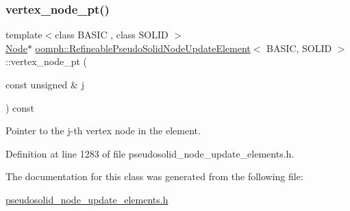 \subsubsection{\texorpdfstring{vertex\+\_\+node\+\_\+pt()}{vertex\_node\_pt()}}
{\footnotesize\ttfamily template$<$class B\+A\+S\+IC , class S\+O\+L\+ID $>$ \\
\hyperlink{classoomph_1_1Node}{Node}$\ast$ \hyperlink{classoomph_1_1RefineablePseudoSolidNodeUpdateElement}{oomph\+::\+Refineable\+Pseudo\+Solid\+Node\+Update\+Element}$<$ B\+A\+S\+IC, S\+O\+L\+ID $>$\+::vertex\+\_\+node\+\_\+pt (\begin{DoxyParamCaption}\item[{const unsigned \&}]{j }\end{DoxyParamCaption}) const\hspace{0.3cm}{\ttfamily [inline]}}



Pointer to the j-\/th vertex node in the element. 



Definition at line 1283 of file pseudosolid\+\_\+node\+\_\+update\+\_\+elements.\+h.



The documentation for this class was generated from the following file\+:\begin{DoxyCompactItemize}
\item 
\hyperlink{pseudosolid__node__update__elements_8h}{pseudosolid\+\_\+node\+\_\+update\+\_\+elements.\+h}\end{DoxyCompactItemize}
